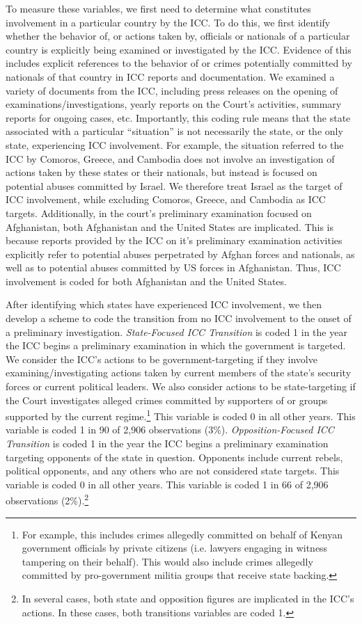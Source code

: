 To measure these variables, we first need to determine what constitutes involvement in a particular country by the ICC. To do this, we first identify whether the behavior of, or actions taken by, officials or nationals of a particular country is explicitly being examined or investigated by the ICC. Evidence of this includes explicit references to the behavior of or crimes potentially committed by nationals of that country in ICC reports and documentation. We examined a variety of documents from the ICC, including press releases on the opening of examinations/investigations, yearly reports on the Court's activities, summary reports for ongoing cases, etc. Importantly, this coding rule means that the state associated with a particular ``situation'' is not necessarily the state, or the only state, experiencing ICC involvement. For example, the situation referred to the ICC by Comoros, Greece, and Cambodia does not involve an investigation of actions taken by these states or their nationals, but instead is focused on potential abuses committed by Israel. We therefore treat Israel as the target of ICC involvement, while excluding Comoros, Greece, and Cambodia as ICC targets. Additionally, in the court's preliminary examination focused on Afghanistan, both Afghanistan and the United States are implicated. This is because reports provided by the ICC on it's preliminary examination activities explicitly refer to potential abuses perpetrated by Afghan forces and nationals, as well as to potential abuses committed by US forces in Afghanistan. Thus, ICC involvement is coded for both Afghanistan and the United States.

After identifying which states have experienced ICC involvement, we then develop a scheme to code the transition from no ICC involvement to the onset of a preliminary investigation. \emph{State-Focused ICC Transition} is coded 1 in the year the ICC begins a preliminary examination in which the government is targeted. We consider the ICC's actions to be government-targeting if they involve examining/investigating actions taken by current members of the state's security forces or current political leaders. We also consider actions to be state-targeting if the Court investigates alleged crimes committed by supporters of or groups supported by the current regime.\footnote{For example, this includes crimes allegedly committed on behalf of Kenyan government officials by private citizens (i.e. lawyers engaging in witness tampering on their behalf). This would also include crimes allegedly committed by pro-government militia groups that receive state backing.} This variable is coded 0 in all other years. This variable is coded 1 in 90 of 2,906 observations (3\%). \emph{Opposition-Focused ICC Transition} is coded 1 in the year the ICC begins a preliminary examination targeting opponents of the state in question. Opponents include current rebels, political opponents, and any others who are not considered state targets. This variable is coded 0 in all other years. This variable is coded 1 in 66 of 2,906 observations (2\%).\footnote{In several cases, both state and opposition figures are implicated in the ICC's actions. In these cases, both transitions variables are coded 1.}


